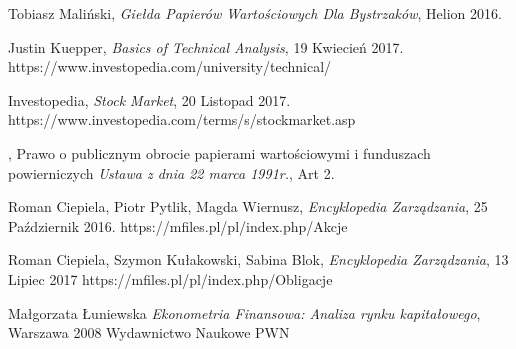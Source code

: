\documentclass[man,mfi|min|mpt|mok|mub|mza|miz|bsp]{mgrwms}
\begin{document}


%

%

%

%

%
%
%
%
% 
\begin{thebibliography}{88}  %

 Tobiasz Maliński, 
\textit{Giełda Papierów Wartościowych Dla Bystrzaków}, Helion 2016.

 Justin Kuepper,
\textit{Basics of Technical Analysis}, 19 Kwiecień 2017.
https://www.investopedia.com/university/technical/

 Investopedia,
\textit{Stock Market}, 20 Listopad 2017.
https://www.investopedia.com/terms/s/stockmarket.asp

, Prawo o publicznym obrocie papierami wartościowymi i funduszach powierniczych
\textit{Ustawa z dnia 22 marca 1991r.}, Art 2.

 Roman Ciepiela, Piotr Pytlik, Magda Wiernusz,
\textit{Encyklopedia Zarządzania}, 25 Październik 2016.
https://mfiles.pl/pl/index.php/Akcje

 Roman Ciepiela, Szymon Kułakowski, Sabina Blok,
\textit{Encyklopedia Zarządzania}, 13 Lipiec 2017
https://mfiles.pl/pl/index.php/Obligacje

 Małgorzata Łuniewska
\textit{Ekonometria Finansowa: Analiza rynku kapitałowego}, Warszawa 2008
Wydawnictwo Naukowe PWN

\end{thebibliography}
\end{document}
